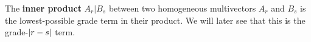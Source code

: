 \begin{definition}\label{d:inner-product1}
	The \textbf{inner product} $A_r|B_s$ between two homogeneous multivectors $A_r$ and $B_s$ is the lowest-possible grade term in their product. We will later see that this is the grade-$\left|r-s\right|$ term.
\end{definition}
